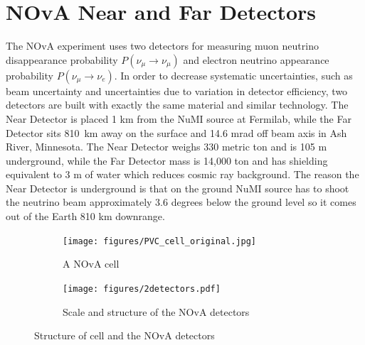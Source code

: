 \section{NOvA Near and Far Detectors}
The NOvA experiment uses two detectors for measuring muon neutrino disappearance probability 
$P(\nu_\mu \rightarrow \nu_\mu)$ and electron neutrino appearance probability $P(\nu_\mu \rightarrow \nu_e)$. 
In order to decrease systematic uncertainties, such as beam uncertainty and uncertainties due to variation
in detector efficiency, two detectors are built with exactly the same material and 
similar technology. The Near Detector is placed 1 km from the NuMI source at Fermilab, while the 
Far Detector sits 810~km away on the surface and 14.6 mrad off beam axis in Ash River, Minnesota. 
The Near Detector weighs 330 metric ton and is 105 m underground, while the Far Detector mass is 
14,000 ton and has shielding equivalent to 3 m of water which reduces cosmic ray background.
The reason the Near Detector is underground is that on the ground NuMI source has to shoot the neutrino beam 
approximately 3.6 degrees below the ground level so it comes out of the Earth 810 km downrange. 
\begin{figure}
\begin{subfigure}{.2\textwidth}
  \centering
  \texttt{[image: figures/PVC\_cell\_original.jpg]}
  \caption{A NOvA cell}
  \label{fig:cell}
\end{subfigure}%
\begin{subfigure}{.8\textwidth}
  \centering
  \texttt{[image: figures/2detectors.pdf]}
  \caption{Scale and structure of the NOvA detectors}
  \label{fig:2detectors}
\end{subfigure}
\caption{Structure of cell and the NOvA detectors}
\label{fig:cell_detectors}
\end{figure}

